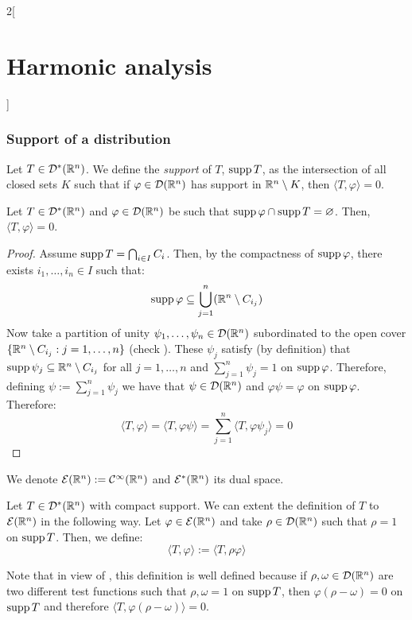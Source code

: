 \documentclass[../../../main_math.tex]{subfiles}
\begin{document}
\begin{multicols}{2}[\section{Harmonic analysis}]
  \subsubsection{Support of a distribution}
  \begin{definition}
    Let $T\in\mathcal{D}^*(\mathbb{R}^n)$. We define the \emph{support} of $T$, $\operatorname{supp} T$, as the intersection of all closed sets $K$ such that if $\varphi\in\mathcal{D}(\mathbb{R}^n)$ has support in $\mathbb{R}^n\setminus K$, then $\langle T, \varphi\rangle=0$.
  \end{definition}
  \begin{lemma}\label{HA:supp_well_def}
    Let $T\in\mathcal{D}^*(\mathbb{R}^n)$ and $\varphi\in\mathcal{D}(\mathbb{R}^n)$ be such that $\operatorname{supp} \varphi \cap \operatorname{supp} T=\varnothing$. Then, $\langle T, \varphi\rangle=0$.
  \end{lemma}
  \begin{proof}
    Assume $\operatorname{supp} T=\bigcap_{i\in I} C_i$. Then, by the compactness of $\operatorname{supp}\varphi$, there exists $i_1,\ldots,i_n\in I$ such that:
    $$
      \operatorname{supp}\varphi\subseteq \bigcup_{j=1}^n (\mathbb{R}^n\setminus C_{i_j})
    $$
    Now take a partition of unity $\psi_1,\ldots,\psi_n\in\mathcal{D}(\mathbb{R}^n)$ subordinated to the open cover $\{\mathbb{R}^n\setminus C_{i_j}:j=1,\ldots,n\}$ (check ). These $\psi_j$ satisfy (by definition) that $\operatorname{supp}\psi_j\subseteq \mathbb{R}^n\setminus C_{i_j}$ for all $j=1,\ldots,n$ and $\sum_{j=1}^{n}\psi_j= 1$ on $\operatorname{supp}\varphi$. Therefore, defining $\psi:=\sum_{j=1}^n \psi_j$ we have that $\psi\in\mathcal{D}(\mathbb{R}^n)$ and $\varphi\psi=\varphi$ on $\operatorname{supp}\varphi$. Therefore:
    $$
      \langle T,\varphi\rangle = \langle T,\varphi\psi\rangle = \sum_{j=1}^n \langle T,\varphi\psi_j\rangle = 0
    $$
  \end{proof}
  \begin{definition}
    We denote $\mathcal{E}(\mathbb{R}^n):=\mathcal{C}^\infty(\mathbb{R}^n)$ and $\mathcal{E}^*(\mathbb{R}^n)$ its dual space.
  \end{definition}
  \begin{definition}
    Let $T\in\mathcal{D}^*(\mathbb{R}^n)$ with compact support. We can extent the definition of $T$ to $\mathcal{E}(\mathbb{R}^n)$ in the following way. Let $\varphi\in\mathcal{E}(\mathbb{R}^n)$ and take $\rho\in\mathcal{D}(\mathbb{R}^n)$ such that $\rho=1$ on $\operatorname{supp} T$. Then, we define:
    $$
      \langle T,\varphi\rangle := \langle T,\rho\varphi\rangle
    $$
  \end{definition}
  \begin{remark}
    Note that in view of , this definition is well defined because if $\rho,\omega\in\mathcal{D}(\mathbb{R}^n)$ are two different test functions such that $\rho,\omega=1$ on $\operatorname{supp} T$, then $\varphi(\rho- \omega)=0$ on $\operatorname{supp} T$ and therefore $\langle T,\varphi(\rho- \omega)\rangle=0$.

\end{remark}
\end{multicols}
\end{document}
